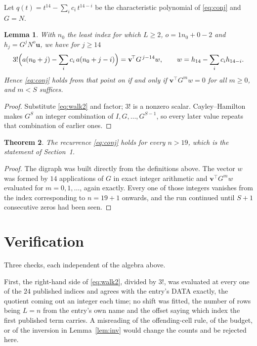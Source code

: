 \documentclass[11pt,a4paper]{article}
\theoremstyle{plain}
\newtheorem{theorem}{Theorem}
\newtheorem{lemma}[theorem]{Lemma}
\theoremstyle{definition}
\begin{document}
Let $q(t)=t^{14}-\sum_i c_i\,t^{14-i}$ be the characteristic polynomial of
\eqref{eq:conj} and $G=N$.

\begin{lemma}\label{lem:crit}
With $n_0$ the least index for which $L\ge2$, $o=1n_0+0-2$ and
$h_j=G^{j}N^{o}\mathbf{u}$, we have for $j\ge14$
\[
3!\Bigl(a(n_0+j)-\sum_i c_i\,a(n_0+j-i)\Bigr)=\mathbf{v}^{\!\top}G^{\,j-14}w,
\qquad w=h_{14}-\sum_i c_i h_{14-i} .
\]
Hence \eqref{eq:conj} holds from that point on if and only if
$\mathbf{v}^{\!\top}G^{m}w=0$ for all $m\ge0$, and $m<S$ suffices.
\end{lemma}

\begin{proof}
Substitute \eqref{eq:walk2} and factor; $3!$ is a nonzero scalar. Cayley--Hamilton
makes $G^{S}$ an integer combination of $I,G,\dots,G^{S-1}$, so every later value repeats
that combination of earlier ones.
\end{proof}

\begin{theorem}
The recurrence \eqref{eq:conj} holds for every $n>19$, which is the statement of
Section~1.
\end{theorem}

\begin{proof}
The digraph was built directly from the definitions above. The vector $w$ was formed by
$14$ applications of $G$ in exact integer arithmetic and $\mathbf{v}^{\!\top}G^{m}w$
evaluated for $m=0,1,\dots$, again exactly. Every one of those integers vanishes from the
index corresponding to $n=19+1$ onwards, and the run continued until $S+1$ consecutive
zeros had been seen.
\end{proof}

\section{Verification}

Three checks, each independent of the algebra above.

First, the right-hand side of \eqref{eq:walk2}, divided by $3!$, was evaluated at every
one of the $24$ published indices and agrees with the entry's DATA exactly, the quotient
coming out an integer each time; no shift was fitted, the number of rows being
$L=n$ from the entry's own name and the offset saying which index the first published
term carries. A misreading of the offending-cell rule, of the budget, or of the inversion in
Lemma~\ref{lem:inv} would change the counts and be rejected here.
\end{document}
